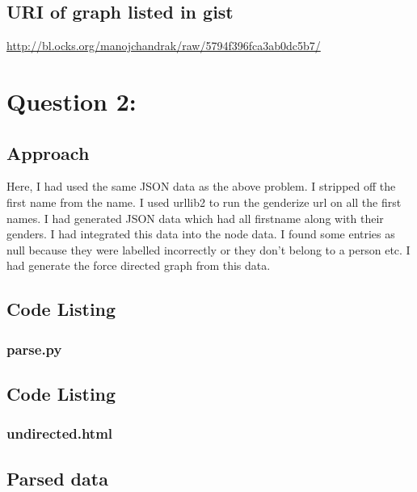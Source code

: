 \documentclass[12pt]{article}
\begin{document}
\subsection{URI of graph listed in gist}
\url{http://bl.ocks.org/manojchandrak/raw/5794f396fca3ab0dc5b7/}

\newpage
\section{Question 2: }

\subsection{Approach}
 Here, I had used the same JSON data as the above problem. I stripped off the first name from the name. I used urllib2 to run the genderize url on all the first names. I had generated JSON data which had all firstname along with their genders. I had integrated this data into the node data.  I found some entries as null because they were labelled incorrectly or they don’t belong to a person etc. I had generate the force directed graph from this data.

\subsection{Code Listing}
\subsubsection{parse.py}

\newpage
\subsection{Code Listing}
\subsubsection{undirected.html}

\newpage
\subsection{Parsed data}
\end{document}
